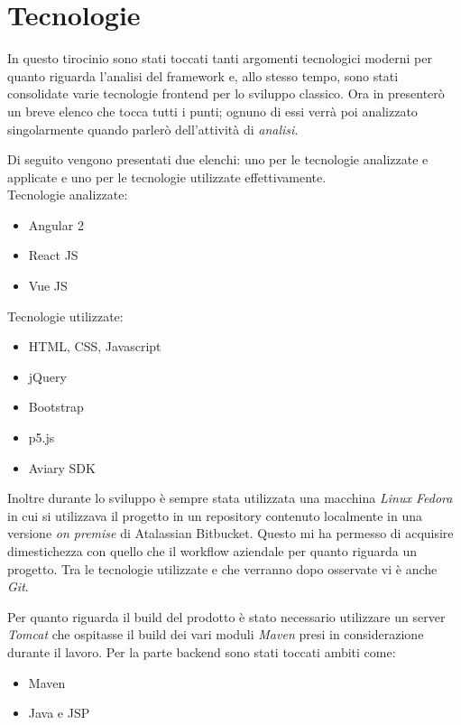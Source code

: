 \documentclass[a4paper]{article}
\begin{document}
\section{Tecnologie}
\label{sec:Tecnologie}
\par In questo tirocinio sono stati toccati tanti argomenti tecnologici moderni
per quanto riguarda l'analisi del framework e, allo stesso tempo, sono stati consolidate
varie tecnologie frontend per lo sviluppo classico. Ora in presenterò un breve elenco
che tocca tutti i punti; ognuno di essi verrà poi analizzato singolarmente quando
parlerò dell'attività di \emph{analisi}.\\
\par Di seguito vengono presentati due elenchi: uno per le tecnologie analizzate e applicate
e uno per le tecnologie utilizzate effettivamente.\\
Tecnologie analizzate:
\begin{itemize}
	\item Angular 2
	\item React JS
	\item Vue JS
\end{itemize}
Tecnologie utilizzate:
\begin{itemize}
	\item HTML, CSS, Javascript
	\item jQuery
	\item Bootstrap
	\item p5.js
	\item Aviary SDK
\end{itemize}
\par Inoltre durante lo sviluppo è sempre stata utilizzata una macchina \emph{Linux Fedora}
in cui si utilizzava il progetto in un repository contenuto localmente in una versione
\emph{on premise} di Atalassian Bitbucket. Questo mi ha permesso di acquisire dimestichezza
con quello che il workflow aziendale per quanto riguarda un progetto.
Tra le tecnologie utilizzate e che verranno dopo osservate vi è anche \emph{Git}.\\
\par Per quanto riguarda il build del prodotto è stato necessario utilizzare un server
\emph{Tomcat} che ospitasse il build dei vari moduli \emph{Maven} presi in considerazione
durante il lavoro.
Per la parte backend sono stati toccati ambiti come:
\begin{itemize}
	\item Maven
	\item Java e JSP
\end{itemize}
\end{document}
